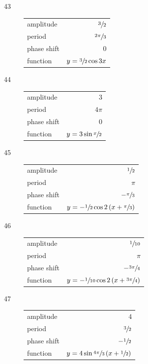\documentclass{exam}
\begin{document}
\begin{description}
    \item[43]
      \begin{tabular}[H]{lr}
        \toprule
        amplitude   & $\sfrac{3}{2}$ \\
        period      & $\sfrac{2 \pi}{3}$ \\
        phase shift & $0$ \\
        function    & $y = \sfrac{3}{2} \cos 3x$ \\
        \bottomrule
      \end{tabular}

    \item[44]
      \begin{tabular}[H]{lr}
        \toprule
        amplitude   & $3$ \\
        period      & $4 \pi$ \\
        phase shift & $0$ \\
        function    & $y = 3 \sin \sfrac{x}{2}$ \\
        \bottomrule
      \end{tabular}

    \item[45]
      \begin{tabular}[H]{lr}
        \toprule
        amplitude   & $\sfrac{1}{2}$ \\
        period      & $\pi$ \\
        phase shift & $- \sfrac{\pi}{3}$ \\
        function    & $y = - \sfrac{1}{2} \cos 2 \left( x + \sfrac{\pi}{3} \right)$ \\
        \bottomrule
      \end{tabular}

    \item[46]
      \begin{tabular}[H]{lr}
        \toprule
        amplitude   & $\sfrac{1}{10}$ \\
        period      & $\pi$ \\
        phase shift & $- \sfrac{3 \pi}{4}$ \\
        function    & $y = - \sfrac{1}{10} \cos 2 \left( x + \sfrac{3 \pi}{4} \right)$ \\
        \bottomrule
      \end{tabular}

    \item[47]
      \begin{tabular}[H]{lr}
        \toprule
        amplitude   & $4$ \\
        period      & $\sfrac{3}{2}$ \\
        phase shift & $- \sfrac{1}{2}$ \\
        function    & $y = 4 \sin \sfrac{4 \pi}{3} \left( x + \sfrac{1}{2} \right)$ \\
        \bottomrule
      \end{tabular}


\end{description}
\end{document}

